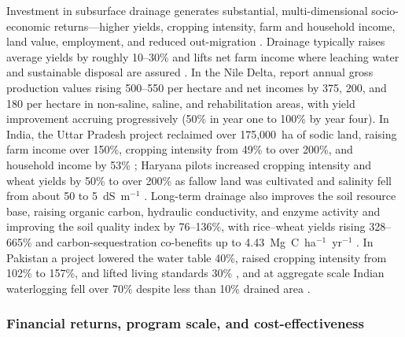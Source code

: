 Investment in subsurface drainage generates substantial, multi-dimensional
socio-economic returns---higher yields, cropping intensity, farm and household
income, land value, employment, and reduced out-migration
\parencite{Gopalakrishnan2007,AbdelDayem2007}. Drainage typically raises average
yields by roughly 10--30\% and lifts net farm income where leaching water and
sustainable disposal are assured \parencite{AbdelDayem2007,Datta2000,Wichelns2002}.
In the Nile Delta, \textcite{Wichelns2002} report annual gross production values
rising 500--550 per hectare and net incomes by 375, 200, and 180 per hectare in
non-saline, saline, and rehabilitation areas, with yield improvement accruing
progressively (50\% in year one to 100\% by year four). In India, the Uttar
Pradesh project reclaimed over 175{,}000~ha of sodic land, raising farm income
over 150\%, cropping intensity from 49\% to over 200\%, and household income by
53\% \parencite{Gopalakrishnan2007}; Haryana pilots increased cropping intensity
and wheat yields by 50\% to over 200\% as fallow land was cultivated and salinity
fell from about 50 to 5~dS~m$^{-1}$ \parencite{Datta2002,Datta2000}. Long-term
drainage also improves the soil resource base, raising organic carbon,
hydraulic conductivity, and enzyme activity and improving the soil quality index
by 76--136\%, with rice--wheat yields rising 328--665\% and carbon-sequestration
co-benefits up to 4.43~Mg~C~ha$^{-1}$~yr$^{-1}$
\parencite{Mukhopadhyay2023,Mukhopadhyay2023b}. In Pakistan a project lowered the
water table 40\%, raised cropping intensity from 102\% to 157\%, and lifted living
standards 30\% \parencite{Ghumman2011}, and at aggregate scale Indian waterlogging
fell over 70\% despite less than 10\% drained area \parencite{Valipour2014}.

\subsubsection{Financial returns, program scale, and cost-effectiveness}

